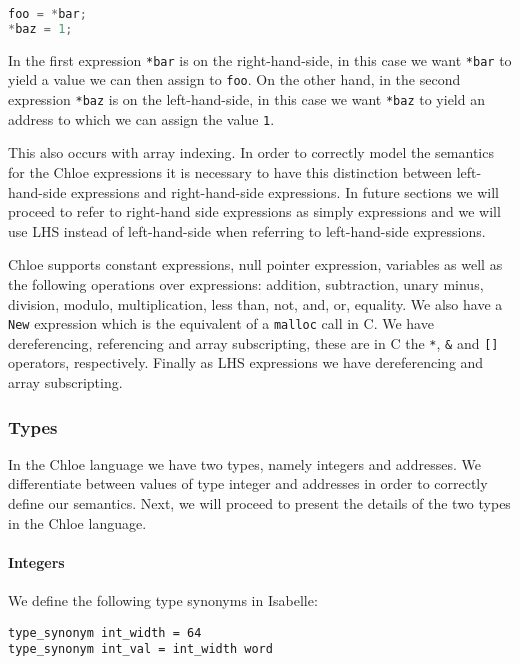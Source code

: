 \begin{lstlisting}[language=C, frame=single]
foo = *bar;
*baz = 1;
\end{lstlisting}

In the first expression \verb|*bar| is on the right-hand-side, in this case we want \verb|*bar| to yield a value we can then assign to \verb|foo|.
On the other hand, in the second expression \verb|*baz| is on the left-hand-side, in this case we want \verb|*baz| to yield an address to which we can assign the value \verb|1|.

This also occurs with array indexing.
In order to correctly model the semantics for the Chloe expressions it is necessary to have this distinction between left-hand-side expressions and right-hand-side expressions.
In future sections we will proceed to refer to right-hand side expressions as simply expressions and we will use LHS instead of left-hand-side when referring to left-hand-side expressions.

Chloe supports constant expressions, null pointer expression, variables as well as the following operations over expressions: addition, subtraction, unary minus, division, modulo, multiplication, less than, not, and, or, equality.
We also have a \verb|New| expression which is the equivalent of a \verb|malloc| call in C.
We have dereferencing, referencing and array subscripting, these are in C the \verb|*|, \verb|&| and \verb|[]| operators, respectively.
Finally as LHS expressions we have dereferencing and array subscripting.

\subsubsection{Types}

In the Chloe language we have two types, namely integers and addresses.
We differentiate between values of type integer and addresses in order to correctly define our semantics.
Next, we will proceed to present the details of the two types in the Chloe language.

\paragraph{Integers}

We define the following type synonyms in Isabelle:

\begin{lstlisting}[frame=single]
type_synonym int_width = 64
type_synonym int_val = int_width word
\end{lstlisting}


